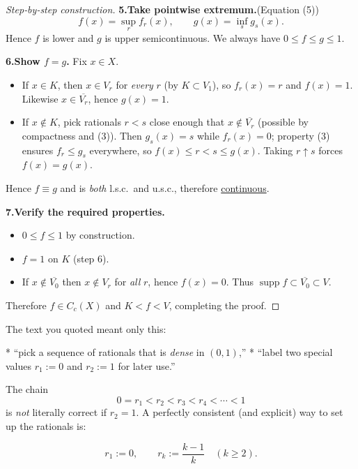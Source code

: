 \documentclass[12pt]{article}
\theoremstyle{definition} %
\theoremstyle{plain} %
\begin{document}
\begin{proof}[Step‐by‐step construction]
  \medskip
  \textbf{5.\;Take pointwise extremum.}\hfill(Equation (5))
  \[
       f(x)=\sup_{r} f_r(x),
       \qquad
       g(x)=\inf_{s} g_s(x).
  \]
  Hence $f$ is lower and $g$ is upper semicontinuous.  
  We always have $0\le f\le g\le1$.
  
  \medskip
  \textbf{6.\;Show $f=g$.}
  Fix $x\in X$.
  \begin{itemize}
  \item If $x\in K$, then $x\in V_r$ for \emph{every} $r$ (by $K\subset V_1$),
        so $f_r(x)=r$ and $f(x)=1$.  
        Likewise $x\in\overline{V_r}$, hence $g(x)=1$.
  \item If $x\notin K$, pick rationals $r<s$ close enough that
        $x\notin\overline{V_r}$ (possible by compactness and (3)).
        Then $g_s(x)=s$ while $f_r(x)=0$; property (3) ensures
        $f_r\le g_s$ everywhere, so $f(x)\le r<s\le g(x)$.  
        Taking $r\uparrow s$ forces $f(x)=g(x)$.
  \end{itemize}
  Hence $f\equiv g$ and is \emph{both} l.s.c.\ and u.s.c., therefore
  \underline{continuous}.
  
  \medskip
  \textbf{7.\;Verify the required properties.}
  \begin{itemize}
  \item $0\le f\le1$ by construction.
  \item $f=1$ on $K$ (step 6).
  \item If $x\notin\overline{V_0}$ then $x\notin V_{r}$ for \emph{all} $r$,
        hence $f(x)=0$.
        Thus $\operatorname{supp}f\subset\overline{V_0}\subset V$.
  \end{itemize}
  
  \medskip\noindent
  Therefore $f\in C_c(X)$ and $K<f<V$, completing the proof.
  \end{proof}
  \pagebreak

The text you quoted meant only this:

* “pick a sequence of rationals that is \emph{dense} in $(0,1)$,”  
* “label two special values $r_1:=0$ and $r_2:=1$ for later use.”

The chain
\[
0=r_1 < r_2 < r_3 < r_4 < \cdots < 1
\]
is \emph{not} literally correct if $r_2=1$.  
A perfectly consistent (and explicit) way to set up the rationals is:

\[
r_1 := 0,\qquad
r_k := \frac{k-1}{k}\quad(k\ge 2).
\]
\end{document}
